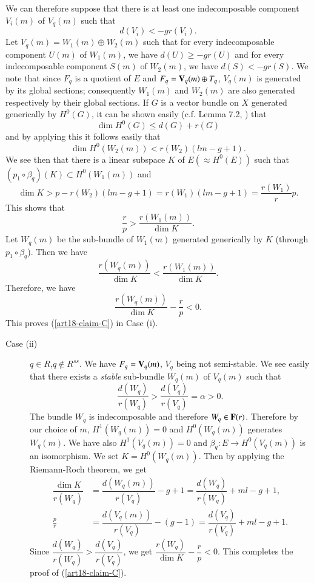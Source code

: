 We can therefore suppose that there is at least one indecomposable component $V_{i}(m)$ of $V_{q}(m)$ such that
$$
d(V_{i})<-gr(V_{i}).
$$
Let $V_{q}(m)=W_{1}(m)\oplus W_{2}(m)$ such that for every indecomposable component $U(m)$ of $W_{1}(m)$, we have $d(U)\geq - gr(U)$ and for every indecomposable component $S(m)$ of $W_{2}(m)$, we have $d(S)<-gr(S)$. We note that since $F_{q}$ is a quotient of $E$ and $F_{q}=\mathbf{V}_{q}(m)\oplus T_{q}$, $V_{q}(m)$ is generated by its global sections; consequently $W_{1}(m)$ and $W_{2}(m)$ are also generated respectively by their global sections. If $G$ is a vector bundle on $X$ generated generically by $H^{0}(G)$, it can be shown easily (c.f. Lemma 7.2, \cite{art18-key12}) that
$$
\dim H^{0}(G)\leq d(G)+r(G)
$$
and by applying this it follows easily that
$$
\dim H^{0}(W_{2}(m))<r(W_{2})(lm-g+1).
$$
We see then that there is a linear subspace $K$ of $E(\approx H^{0}(E))$ such that $(p_{1}\circ \beta_{q})(K)\subset H^{0}(W_{1}(m))$ and
$$
\dim K>p-r(W_{2})(lm-g+1)=r(W_{1})(lm-g+1)=\dfrac{r(W_{1})}{r}p.
$$
This shows that
$$
\frac{r}{p}>\frac{r(W_{1}(m))}{\dim K}.
$$
Let $W_{q}(m)$ be the sub-bundle of $W_{1}(m)$ generated generically by $K$ (through $p_{1}\circ \beta_{q}$). Then we have
$$
\dfrac{r(W_{q}(m))}{\dim K}<\dfrac{r(W_{1}(m))}{\dim K}.
$$
Therefore, we have
$$
\frac{r(W_{q}(m))}{\dim K}-\dfrac{r}{p}<0.
$$
This proves (\ref{art18-claim-C}) in Case (i).

\begin{description}
\item[Case (ii)] $q\in R$,\pageoriginale $q\not\in R^{ss}$. We have $F_{q}=\mathbf{V}_{q}(m)$, $V_{q}$ being not semi-stable. We see easily that there exists a {\em stable} sub-bundle $W_{q}(m)$ of $V_{q}(m)$ such that
$$
\dfrac{d(W_{q})}{r(W_{q})}>\dfrac{d(V_{q})}{r(V_{q})}=\alpha > 0.
$$
The bundle $W_{q}$ is indecomposable and therefore $W_{q}\in \mathbf{F}(r)$. Therefore by our choice of $m$, $H^{1}(W_{q}(m))=0$ and $H^{0}(W_{q}(m))$ generates $W_{q}(m)$. We have also $H^{1}(V_{q}(m))=0$ and $\beta_{q}:E\to H^{0}(V_{q}(m))$ is an isomorphism. We set $K=H^{0}(W_{q}(m))$. Then by applying the Riemann-Roch theorem, we get
\begin{align*}
\dfrac{\dim K}{r(W_{q})} &=\dfrac{d(W_{q}(m))}{r(V_{q})}-g+1=\dfrac{d(W_{q})}{r(W_{q})}+ml-g+1,\\
\frac{p}{r} &= \dfrac{d(V_{q}(m))}{r(V_{q})}-(g-1)=\dfrac{d(V_{q})}{r(V_{q})}+ml-g+1.
\end{align*}
Since $\dfrac{d(W_{q})}{r(W_{q})}>\dfrac{d(V_{q})}{r(V_{q})}$, we get $\dfrac{r(W_{q})}{\dim K}-\dfrac{r}{p}<0$. This completes the proof of (\ref{art18-claim-C}).
\end{description}

